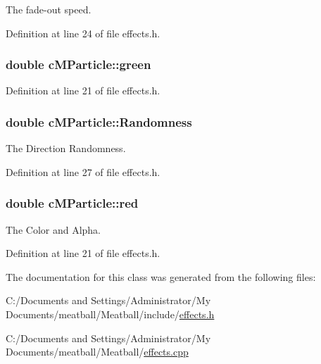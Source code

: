 The fade-\/out speed. 



Definition at line 24 of file effects.\-h.

\hypertarget{classc_m_particle_a7dc2ceeb185589e0f2184c966739455d}{
\subsubsection[{green}]{\setlength{\rightskip}{0pt plus 5cm}double c\-M\-Particle\-::green}}\label{classc_m_particle_a7dc2ceeb185589e0f2184c966739455d}


Definition at line 21 of file effects.\-h.

\hypertarget{classc_m_particle_a6df51f38f42317961cbdd55dca8f20fa}{
\subsubsection[{Randomness}]{\setlength{\rightskip}{0pt plus 5cm}double c\-M\-Particle\-::\-Randomness}}\label{classc_m_particle_a6df51f38f42317961cbdd55dca8f20fa}


The Direction Randomness. 



Definition at line 27 of file effects.\-h.

\hypertarget{classc_m_particle_ad88df0d1dc8eb30154ccb48de8be4e72}{
\subsubsection[{red}]{\setlength{\rightskip}{0pt plus 5cm}double c\-M\-Particle\-::red}}\label{classc_m_particle_ad88df0d1dc8eb30154ccb48de8be4e72}


The Color and Alpha. 



Definition at line 21 of file effects.\-h.



The documentation for this class was generated from the following files\-:\begin{DoxyCompactItemize}
\item 
C\-:/\-Documents and Settings/\-Administrator/\-My Documents/meatball/\-Meatball/include/\hyperlink{effects_8h}{effects.\-h}\item 
C\-:/\-Documents and Settings/\-Administrator/\-My Documents/meatball/\-Meatball/\hyperlink{effects_8cpp}{effects.\-cpp}\end{DoxyCompactItemize}

